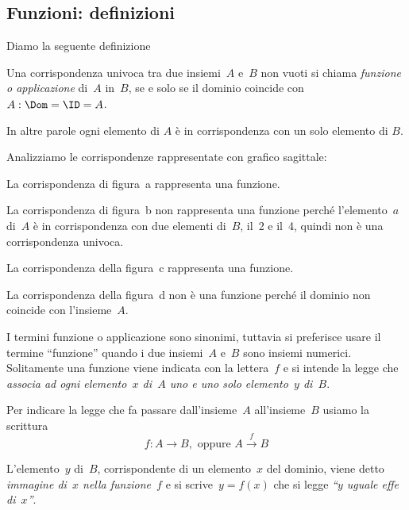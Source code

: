 \subsection{Funzioni: definizioni}
\label{subsec:fun_definizioni}

Diamo la seguente definizione

\begin{definizione}
 Una corrispondenza univoca tra due insiemi~$A$ e~$B$ non vuoti
si chiama \emph{funzione o applicazione} di~$A$ in~$B$, se e solo se il dominio 
coincide con~$A: \Dom = \ID = A$.
\end{definizione}
In altre parole ogni elemento di $A$ è in corrispondenza con un solo elemento di 
$B$.
\begin{exrig}
 \begin{esempio}
\label{ex:D.1}
Analizziamo le corrispondenze rappresentate con grafico sagittale:
 \begin{center}
  
 \end{center}

La corrispondenza di figura~a rappresenta una funzione.

La corrispondenza di figura~b non rappresenta una funzione perché
l'elemento~$a$ di~$A$ è in corrispondenza con due
elementi di~$B$, il~2 e il~4, quindi non è una corrispondenza univoca.

La corrispondenza della figura~c rappresenta una funzione.

La corrispondenza della figura~d non è una funzione perché il
dominio non coincide con l'insieme~$A$.
 \end{esempio}

\end{exrig}

I termini funzione o applicazione sono sinonimi, tuttavia si preferisce
usare il termine ``funzione'' quando i due insiemi~$A$ e~$B$ sono insiemi 
numerici. Solitamente una funzione
viene indicata con la lettera~$f$ e si intende la legge
che \emph{associa ad ogni elemento~$x$ di~$A$ uno e uno solo elemento~$y$ 
di~$B$}.

Per indicare la legge che fa passare dall'insieme~$A$ all'insieme~$B$ usiamo la 
scrittura
\begin{equation*}
f:A \rightarrow B,\text{ oppure } A\overset{{f}}{{\rightarrow }}B
\end{equation*}

\begin{definizione}
 L'elemento~$y$ di~$B$, corrispondente di un elemento~$x$ del dominio, viene 
detto \emph{immagine di~$x$ nella funzione~$f$} e
si scrive~$y = f(x)$ che si legge \emph{``$y$ uguale effe di~$x$''}.
\end{definizione}


